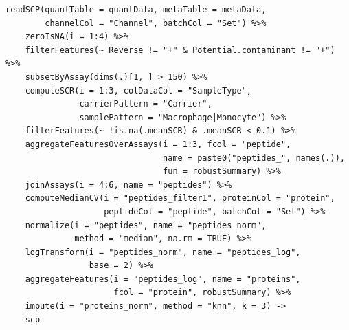 \documentclass{article}
\begin{document}
\begin{multicols}{2}
\begin{minipage}[t]{\linewidth}
  \begin{lstlisting}
readSCP(quantTable = quantData, metaTable = metaData,
        channelCol = "Channel", batchCol = "Set") %>%
    zeroIsNA(i = 1:4) %>%
    filterFeatures(~ Reverse != "+" & Potential.contaminant != "+") %>%
    subsetByAssay(dims(.)[1, ] > 150) %>%
    computeSCR(i = 1:3, colDataCol = "SampleType",
               carrierPattern = "Carrier",
               samplePattern = "Macrophage|Monocyte") %>%
    filterFeatures(~ !is.na(.meanSCR) & .meanSCR < 0.1) %>%
    aggregateFeaturesOverAssays(i = 1:3, fcol = "peptide",
                                name = paste0("peptides_", names(.)),
                                fun = robustSummary) %>%
    joinAssays(i = 4:6, name = "peptides") %>%
    computeMedianCV(i = "peptides_filter1", proteinCol = "protein",
                    peptideCol = "peptide", batchCol = "Set") %>%
    normalize(i = "peptides", name = "peptides_norm",
              method = "median", na.rm = TRUE) %>%
    logTransform(i = "peptides_norm", name = "peptides_log",
                 base = 2) %>%
    aggregateFeatures(i = "peptides_log", name = "proteins",
                      fcol = "protein", robustSummary) %>%
    impute(i = "proteins_norm", method = "knn", k = 3) ->
    scp
  \end{lstlisting}

\end{minipage}


\noindent
\begin{minipage}[t]{\linewidth}
  \vspace{0.55cm}

\end{minipage}
\end{multicols}
\end{document}
